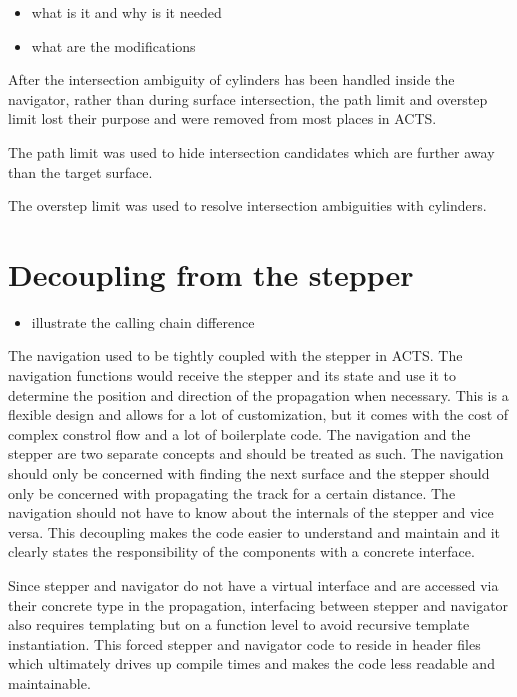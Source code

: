 \begin{itemize}
    \color{red}
    \item what is it and why is it needed
    \item what are the modifications
\end{itemize}

After the intersection ambiguity of cylinders has been handled inside the navigator, rather than during surface intersection, the path limit and overstep limit lost their purpose and were removed from most places in ACTS.

The path limit was used to hide intersection candidates which are further away than the target surface.

The overstep limit was used to resolve intersection ambiguities with cylinders.

\section{Decoupling from the stepper}

\begin{itemize}
    \color{red}
    \item illustrate the calling chain difference
\end{itemize}

The navigation used to be tightly coupled with the stepper in ACTS. The navigation functions would receive the stepper and its state and use it to determine the position and direction of the propagation when necessary. This is a flexible design and allows for a lot of customization, but it comes with the cost of complex constrol flow and a lot of boilerplate code. The navigation and the stepper are two separate concepts and should be treated as such. The navigation should only be concerned with finding the next surface and the stepper should only be concerned with propagating the track for a certain distance. The navigation should not have to know about the internals of the stepper and vice versa. This decoupling makes the code easier to understand and maintain and it clearly states the responsibility of the components with a concrete interface.

Since stepper and navigator do not have a virtual interface and are accessed via their concrete type in the propagation, interfacing between stepper and navigator also requires templating but on a function level to avoid recursive template instantiation. This forced stepper and navigator code to reside in header files which ultimately drives up compile times and makes the code less readable and maintainable.

